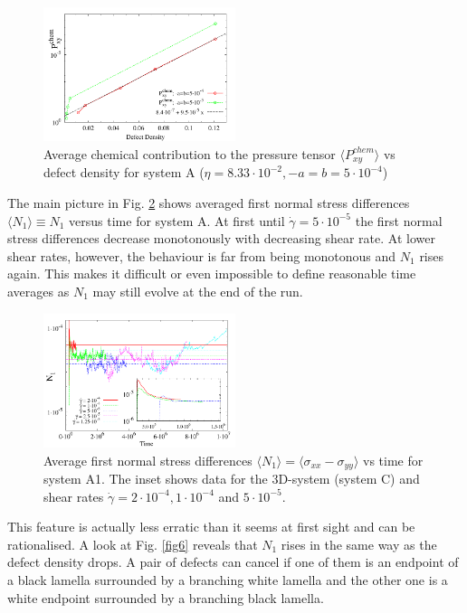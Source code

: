 \documentclass[8.5pt,twoside,twocolumn]{article}
\newcommand{\e}[1]{\cdot10^{#1}}
\newcommand{\gd}{\dot{\gamma}}
\begin{document}
\begin{figure}[!]
\centering
\includegraphics[angle=0,width=0.5\textwidth]{P_xy_defect_density.pdf}
\caption{Average chemical contribution to the pressure tensor $\langle P_{xy}^{chem}\rangle$ vs defect density for system A ($\eta=8.33\cdot10^{-2}, -a=b=5\cdot 10^{-4}$)} 
\label{fig9}
\end{figure}
The main picture in Fig. \ref{fig10} shows averaged first normal stress differences $\langle N_1\rangle \equiv N_1$ versus time for system A.
At first until $\gd=5\e{-5}$ the first normal stress differences decrease monotonously with decreasing shear rate.
At lower shear rates, however, the behaviour is far from being monotonous and $N_1$ rises again.
This makes it difficult or even impossible to define reasonable time averages as $N_1$ may still evolve at the end of the run.
\begin{figure}[!]
\centering
\includegraphics[angle=0,width=0.5\textwidth]{N1_t_5e-4.pdf}
\caption{Average first normal stress differences $\langle N_1 \rangle= \langle \sigma_{xx}-\sigma_{yy}\rangle$ vs time for system A1. The inset shows data for the 3D-system (system C) and shear rates $\dot{\gamma}=2\cdot10^{-4}, 1\cdot10^{-4}$ and $5\cdot10^{-5}$.}
\label{fig10}
\end{figure}
This feature is actually less erratic than it seems at first sight and can be rationalised. 
A look at Fig. \ref{fig6} reveals that $N_1$ rises in the same way as the defect density drops.
A pair of defects can cancel if one of them is an endpoint of a black lamella surrounded by a branching white lamella and the other one is a white endpoint surrounded by a branching black lamella.
\end{document}

